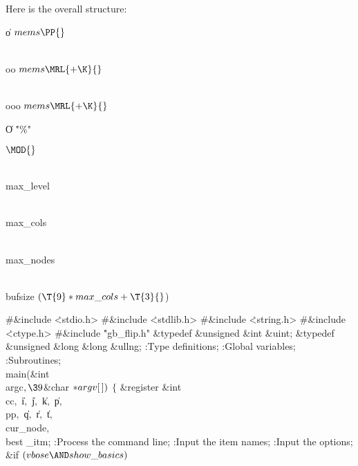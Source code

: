 Here is the overall structure:

\Y\B\4\D\|o\5
$\\{mems}\PP{}$\par
\B\4\D\\{oo}\5
$\\{mems}\MRL{+{\K}}{}$\par
\B\4\D\\{ooo}\5
$\\{mems}\MRL{+{\K}}{}$\par
\B\4\D\|O\5
\.{"\%"}\par
\B\4\D\Xmod\5
$\MOD{}$\par
\B\4\D\\{max\_level}\5
\par
\B\4\D\\{max\_cols}\5
\par
\B\4\D\\{max\_nodes}\5
\par
\B\4\D\\{bufsize}\5
$(\T{9}*\\{max\_cols}+\T{3}{}$)%
\par
\Y\B\8\#\&{include} \.{<stdio.h>}\6
\8\#\&{include} \.{<stdlib.h>}\6
\8\#\&{include} \.{<string.h>}\6
\8\#\&{include} \.{<ctype.h>}\6
\8\#\&{include} \.{"gb\_flip.h"}\6
\&{typedef} \&{unsigned} \&{int} \&{uint};\6
\&{typedef} \&{unsigned} \&{long} \&{long} \&{ullng};\7
:Type definitions\X;\6
:Global variables\X;\6
:Subroutines\X;\7
\\{main}(\&{int} \\{argc}${},\39{}$\&{char} ${}{*}\\{argv}[\,]){}$\1\1\2\2\6
${}\{{}$\1\6
\&{register} \&{int} \\{cc}${},{}$ \|i${},{}$ \|j${},{}$ \|k${},{}$ \|p${},{}$ %
\\{pp}${},{}$ \|q${},{}$ \|r${},{}$ \|t${},{}$ \\{cur\_node}${},{}$ \\{best%
\_itm};\7
:Process the command line\X;\6
:Input the item names\X;\6
:Input the options\X;\6
\&{if} ${}(\\{vbose}\AND\\{show\_basics}){}$\1\5
